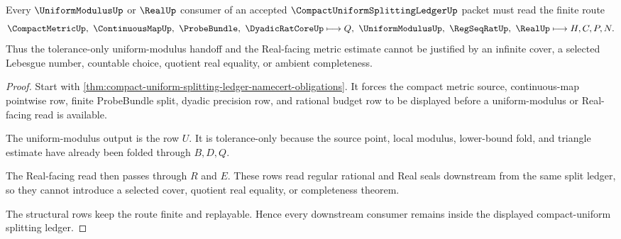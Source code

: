 \begin{theorem}
\label{thm:compact-uniform-splitting-ledger-nonescape}
Every $\UniformModulusUp$ or $\RealUp$ consumer of an accepted $\CompactUniformSplittingLedgerUp$ packet must read the finite route
$$
\CompactMetricUp,\ \ContinuousMapUp,\ \ProbeBundle,\ \DyadicRatCoreUp
\longmapsto Q,\ \UniformModulusUp,\ \RegSeqRatUp,\ \RealUp
\longmapsto H,C,P,N .
$$
Thus the tolerance-only uniform-modulus handoff and the Real-facing metric estimate cannot be justified by an infinite cover, a selected Lebesgue number, countable choice, quotient real equality, or ambient completeness.
\end{theorem}
\begin{proof}
Start with \autoref{thm:compact-uniform-splitting-ledger-namecert-obligations}. It forces the compact metric source, continuous-map pointwise row, finite ProbeBundle split, dyadic precision row, and rational budget row to be displayed before a uniform-modulus or Real-facing read is available.

The uniform-modulus output is the row $U$. It is tolerance-only because the source point, local modulus, lower-bound fold, and triangle estimate have already been folded through $B,D,Q$.

The Real-facing read then passes through $R$ and $E$. These rows read regular rational and Real seals downstream from the same split ledger, so they cannot introduce a selected cover, quotient real equality, or completeness theorem.

The structural rows keep the route finite and replayable. Hence every downstream consumer remains inside the displayed compact-uniform splitting ledger.
\end{proof}

